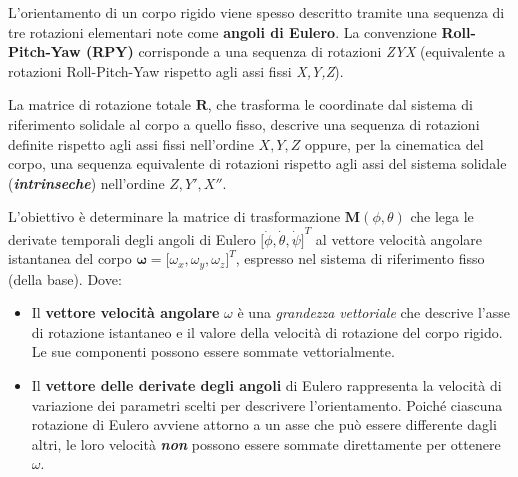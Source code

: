 \documentclass[11pt, a4paper]{article}
\begin{document}

\begin{par}
\begin{flushleft}
L'orientamento di un corpo rigido viene spesso descritto tramite una sequenza di tre rotazioni elementari note come \textbf{angoli di Eulero}. La convenzione \textbf{Roll-Pitch-Yaw (RPY)} corrisponde a una sequenza di rotazioni \textit{ZYX} (equivalente a rotazioni Roll-Pitch-Yaw rispetto agli assi fissi \textit{X,Y,Z}).
\end{flushleft}
\end{par}

\begin{par}
\begin{flushleft}
La matrice di rotazione totale $\mathbf{R}$, che trasforma le coordinate dal sistema di riferimento solidale al corpo a quello fisso, descrive una sequenza di rotazioni definite rispetto agli assi fissi nell'ordine $X, Y, Z$ oppure, per la cinematica del corpo, una sequenza equivalente di rotazioni rispetto agli assi del sistema solidale (\textit{\textbf{intrinseche}}) nell'ordine $Z, Y', X''$.
\end{flushleft}
\end{par}

\begin{par}
\begin{flushleft}
L'obiettivo è determinare la matrice di trasformazione $\mathbf{M}(\phi ,\theta )$ che lega le derivate temporali degli angoli di Eulero ${\bigl\lbrack \dot{\phi} ,\dot{\theta} ,\dot{\psi} \bigr\rbrack }^T$ al vettore velocità angolare istantanea del corpo $\boldsymbol{\omega}={\bigl\lbrack \omega_x ,\omega_y ,\omega_z \bigr\rbrack }^T$, espresso nel sistema di riferimento fisso (della base). Dove:
\end{flushleft}
\end{par}

\begin{itemize}
   \item{\begin{flushleft} Il \textbf{vettore velocità angolare} $\omega$ è una \textit{grandezza} \textit{vettoriale} che descrive l'asse di rotazione istantaneo e il valore della velocità di rotazione del corpo rigido. Le sue componenti possono essere sommate vettorialmente. \end{flushleft}}
   \item{\begin{flushleft} Il \textbf{vettore delle derivate degli angoli }di Eulero rappresenta la velocità di variazione dei parametri scelti per descrivere l'orientamento. Poiché ciascuna rotazione di Eulero avviene attorno a un asse che può essere differente dagli altri, le loro velocità \textit{\textbf{non}} possono essere sommate direttamente per ottenere $\omega$. \end{flushleft}}
\end{itemize}
\end{document}
